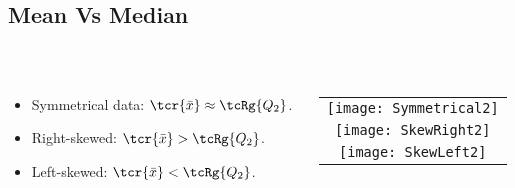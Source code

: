 \subsection{Mean Vs Median}
\begin{frame}{\bf {}\\[-1.3cm]}
\begin{columns}

\begin{column}{.5\textwidth}
\begin{adjustwidth}{-0.1cm}{0.0cm}
\begin{itemize}\itemsep2.3cm
\item Symmetrical data: $\tcr{\bar x} \approx \tcRg{Q_2}$.
\item Right-skewed: $\tcr{\bar x} > \tcRg{Q_2}$.
\item Left-skewed: $\tcr{\bar x} < \tcRg{Q_2}$.
\end{itemize}
\end{adjustwidth}
\end{column}

\begin{column}{.5\textwidth}
\begin{adjustwidth}{-0.3cm}{0.0cm}

\begin{tabular}{c}
\texttt{[image: Symmetrical2]}\\
\texttt{[image: SkewRight2]}\\
\texttt{[image: SkewLeft2]}
\end{tabular}


\end{adjustwidth}
\end{column}

\end{columns}

\end{frame}


